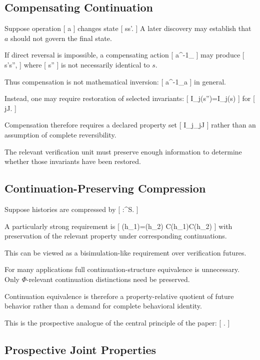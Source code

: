 \documentclass[11pt]{article}
\begin{document}
\subsection{Compensating Continuation}

Suppose operation
[
a
]
changes state
[
s\to s'.
]
A later discovery may establish that $a$ should not govern the final state.

If direct reversal is impossible, a compensating action
[
a^{-1}_{}
]
may produce
[
s'\to s'',
]
where
[
s''
]
is not necessarily identical to $s$.

Thus compensation is not mathematical inversion:
[
a^{-1}_{}\circ a
\neq
{}
]
in general.

Instead, one may require restoration of selected invariants:
[
I_j(s'')=I_j(s)
]
for
[
j\in J.
]

Compensation therefore requires a declared property set
[
{I_j}_{j\in J}
]
rather than an assumption of complete reversibility.

The relevant verification unit must preserve enough information to determine whether those invariants have been restored.

\subsection{Continuation-Preserving Compression}

Suppose histories are compressed by
[
\sigma:\Sigma^\ast\to S.
]

A particularly strong requirement is
[
\sigma(h_1)=\sigma(h_2)
\Longrightarrow
\mathcal C(h_1)\cong\mathcal C(h_2)
]
with preservation of the relevant property under corresponding continuations.

This can be viewed as a bisimulation-like requirement over verification futures.

For many applications full continuation-structure equivalence is unnecessary. Only $\Phi$-relevant continuation distinctions need be preserved.

Continuation equivalence is therefore a property-relative quotient of future behavior rather than a demand for complete behavioral identity.

This is the prospective analogue of the central principle of the paper:
[
.
]

\subsection{Prospective Joint Properties}
\end{document}
